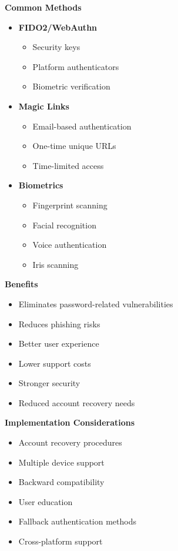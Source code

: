 \textbf{Common Methods}
\begin{itemize}
    \item \textbf{FIDO2/WebAuthn}
        \begin{itemize}
            \item Security keys
            \item Platform authenticators
            \item Biometric verification
        \end{itemize}
    
    \item \textbf{Magic Links}
        \begin{itemize}
            \item Email-based authentication
            \item One-time unique URLs
            \item Time-limited access
        \end{itemize}

    \item \textbf{Biometrics}
        \begin{itemize}
            \item Fingerprint scanning
            \item Facial recognition
            \item Voice authentication
            \item Iris scanning
        \end{itemize}
\end{itemize}

\textbf{Benefits}
\begin{itemize}
    \item Eliminates password-related vulnerabilities
    \item Reduces phishing risks
    \item Better user experience
    \item Lower support costs
    \item Stronger security
    \item Reduced account recovery needs
\end{itemize}

\textbf{Implementation Considerations}
\begin{itemize}
    \item Account recovery procedures
    \item Multiple device support
    \item Backward compatibility
    \item User education
    \item Fallback authentication methods
    \item Cross-platform support
\end{itemize}

